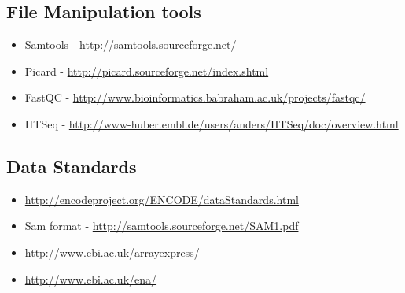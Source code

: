 \documentclass[a4paper,11pt,english]{sphinxmanual}
\begin{document}
\subsection{File Manipulation tools}
\label{ReadingList:file-manipulation-tools}\begin{itemize}
\item {} 
Samtools - \href{http://samtools.sourceforge.net/}{http://samtools.sourceforge.net/}

\item {} 
Picard - \href{http://picard.sourceforge.net/index.shtml}{http://picard.sourceforge.net/index.shtml}

\item {} 
FastQC - \href{http://www.bioinformatics.babraham.ac.uk/projects/fastqc/}{http://www.bioinformatics.babraham.ac.uk/projects/fastqc/}

\item {} 
HTSeq - \href{http://www-huber.embl.de/users/anders/HTSeq/doc/overview.html}{http://www-huber.embl.de/users/anders/HTSeq/doc/overview.html}

\end{itemize}


\subsection{Data Standards}
\label{ReadingList:data-standards}\begin{itemize}
\item {} 
\href{http://encodeproject.org/ENCODE/dataStandards.html}{http://encodeproject.org/ENCODE/dataStandards.html}

\item {} 
Sam format - \href{http://samtools.sourceforge.net/SAM1.pdf}{http://samtools.sourceforge.net/SAM1.pdf}

\item {} 
\href{http://www.ebi.ac.uk/arrayexpress/}{http://www.ebi.ac.uk/arrayexpress/}

\item {} 
\href{http://www.ebi.ac.uk/ena/}{http://www.ebi.ac.uk/ena/}

\end{itemize}
\end{document}
